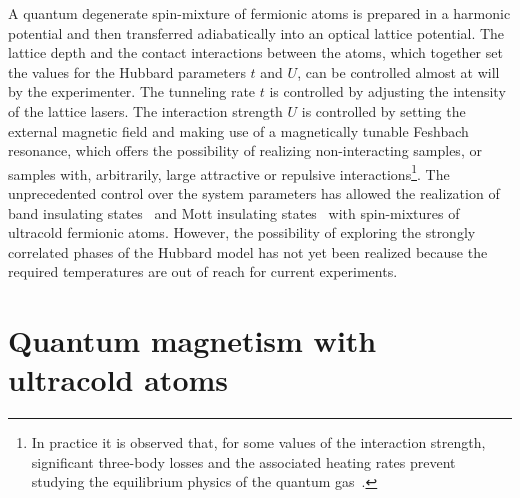 A quantum degenerate spin-mixture of fermionic atoms is prepared in a harmonic
potential and then transferred adiabatically into an optical lattice potential.
The lattice depth and the contact interactions between the atoms, which
together set the values for the Hubbard parameters $t$ and $U$, can be
controlled almost at will by the experimenter.  The tunneling rate $t$ is
controlled  by adjusting the intensity of the lattice lasers.  The interaction
strength $U$ is controlled by setting the external magnetic field and making
use of a magnetically tunable Feshbach resonance, which offers the possibility
of realizing non-interacting samples, or samples with, arbitrarily, large
attractive or repulsive interactions\footnote{In practice it is observed that,
for some values of the interaction strength, significant three-body losses and
the associated heating rates prevent studying the equilibrium physics of the
quantum gas~\cite{PhysRevA.85.063615}.}.  The unprecedented control over the
system parameters has allowed the realization of band insulating
states~\cite{Kohl2005} and Mott insulating
states~\cite{Jordens2008,Schneider2008} with spin-mixtures of ultracold
fermionic atoms.  However, the possibility of exploring the strongly correlated
phases of the Hubbard model has not yet been realized because the required
temperatures are out of reach for current experiments.    


 
\section{Quantum magnetism with ultracold atoms }

